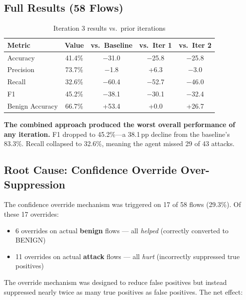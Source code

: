 \documentclass[12pt, a4paper, oneside]{report}
\begin{document}
\subsection{Full Results (58 Flows)}

\begin{table}[H]
\centering
\caption{Iteration 3 results vs.\ prior iterations}
\label{tab:iter3-results}
\begin{tabular}{@{}lcccc@{}}
\toprule
\textbf{Metric} & \textbf{Value} & \textbf{vs.\ Baseline} & \textbf{vs.\ Iter 1} & \textbf{vs.\ Iter 2} \\
\midrule
Accuracy        & 41.4\%  & $-$31.0 & $-$25.8 & $-$25.8 \\
Precision       & 73.7\%  & $-$1.8  & +6.3    & $-$3.0  \\
Recall          & 32.6\%  & $-$60.4 & $-$52.7 & $-$46.0 \\
F1              & 45.2\%  & $-$38.1 & $-$30.1 & $-$32.4 \\
Benign Accuracy & 66.7\%  & +53.4   & +0.0    & +26.7   \\
\bottomrule
\end{tabular}
\end{table}

\textbf{The combined approach produced the worst overall performance of any
iteration.} F1 dropped to 45.2\%---a 38.1\,pp decline from the baseline's 83.3\%.
Recall collapsed to 32.6\%, meaning the agent missed 29 of 43 attacks.

\subsection{Root Cause: Confidence Override Over-Suppression}

The confidence override mechanism was triggered on 17 of 58 flows (29.3\%).
Of these 17 overrides:
\begin{itemize}
  \item 6 overrides on actual \textbf{benign} flows --- all \emph{helped}
        (correctly converted to BENIGN)
  \item 11 overrides on actual \textbf{attack} flows --- all \emph{hurt}
        (incorrectly suppressed true positives)
\end{itemize}

The override mechanism was designed to reduce false positives but instead
suppressed nearly twice as many true positives as false positives. The net
effect:
\end{document}
